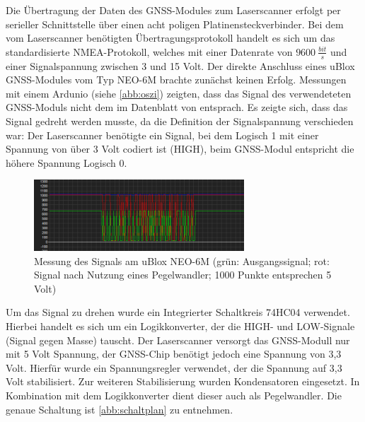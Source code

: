 \documentclass[a4paper,12pt,bibliography=totoc, listof=totoc,titlepage,pointlessnumbers]{scrreprt}
\begin{document}
Die Übertragung der Daten des GNSS-Modules zum Laserscanner erfolgt per serieller Schnittstelle über einen acht poligen Platinensteckverbinder. Bei dem vom Laserscanner benötigten Übertragungsprotokoll handelt es sich um das standardisierte NMEA-Protokoll, welches mit einer Datenrate von \(9600~\frac{bit}{s}\) und einer Signalspannung zwischen 3 und 15 Volt. Der direkte Anschluss eines uBlox GNSS-Modules vom Typ NEO-6M brachte zunächst keinen Erfolg. Messungen mit einem Ardunio (siehe \autoref{abb:oszi}) zeigten, dass das Signal des verwendeteten GNSS-Moduls nicht dem im Datenblatt von \citet[S. 3]{vlpInterface} entsprach. Es zeigte sich, dass das Signal gedreht werden musste, da die Definition der Signalspannung verschieden war: Der Laserscanner benötigte ein Signal, bei dem Logisch 1 mit einer Spannung von über 3 Volt \citep[S. 3]{vlpInterface} codiert ist (HIGH), beim GNSS-Modul entspricht  die höhere Spannung Logisch 0.

\begin{figure}[ht!]
 \centering
 \includegraphics[width=0.7\textwidth]{img/oszi.png}
 \caption{Messung des Signals am uBlox NEO-6M (grün: Ausgangssignal; rot: Signal nach Nutzung eines Pegelwandler; 1000 Punkte entsprechen 5 Volt)}
 \label{abb:oszi}
\end{figure}

Um das Signal zu drehen wurde ein Integrierter Schaltkreis 74HC04 verwendet. Hierbei handelt es sich um ein Logikkonverter, der die HIGH- und LOW-Signale (Signal gegen Masse) tauscht. Der Laserscanner versorgt das GNSS-Modull nur mit 5 Volt Spannung, der GNSS-Chip benötigt jedoch eine Spannung von 3,3 Volt. Hierfür wurde ein Spannungsregler verwendet, der die Spannung auf 3,3 Volt stabilisiert. Zur weiteren Stabilisierung wurden Kondensatoren eingesetzt. In Kombination mit dem Logikkonverter dient dieser auch als Pegelwandler. Die genaue Schaltung ist \autoref{abb:schaltplan} zu entnehmen.
\end{document}
